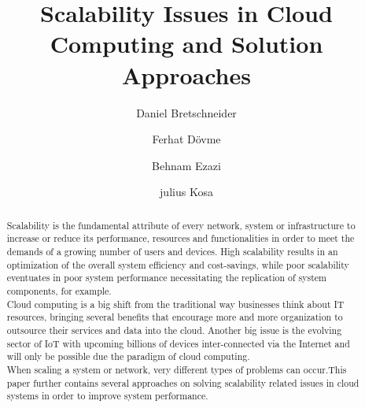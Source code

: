 \documentclass[sigconf]{acmart}
\begin{document}
\title{Scalability Issues in Cloud Computing and  Solution Approaches}

\author{Daniel Bretschneider}

\author{Ferhat Dövme}

\author{Behnam Ezazi}

\author{julius Kosa}


\renewcommand{\shortauthors}{}

\begin{abstract}
Scalability is the fundamental attribute of every network,
system or infrastructure to increase or reduce its
performance, resources and functionalities in order to meet
the demands of a growing number of users and devices. High
scalability results in an optimization of the overall system
efficiency and cost-savings, while poor scalability eventuates
in poor system performance necessitating the replication of
system components, for example.\\

Cloud computing is a big shift from the traditional way
businesses think about IT resources, bringing several
benefits that encourage more and more organization to
outsource their services and data into the cloud. Another big
issue is the evolving sector of IoT with upcoming billions of
devices inter-connected via the Internet and will only be
possible due the paradigm of cloud computing.\\

When scaling a system or network, very different types of
problems can occur.This paper further contains several approaches 
on solving scalability related issues in cloud systems in order to
improve system performance.
\end{abstract}
\end{document}
